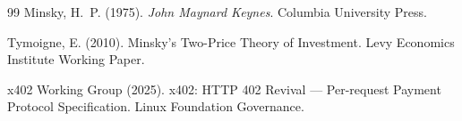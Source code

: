 \documentclass[11pt,letterpaper]{article}
\theoremstyle{assumption}
\begin{document}
\begin{thebibliography}{99}
Minsky, H.~P. (1975).
\newblock \emph{John Maynard Keynes}.
\newblock Columbia University Press.

Tymoigne, E. (2010).
\newblock Minsky's Two-Price Theory of Investment.
\newblock Levy Economics Institute Working Paper.

x402 Working Group (2025).
\newblock x402: HTTP 402 Revival --- Per-request Payment Protocol Specification.
\newblock Linux Foundation Governance.

\end{thebibliography}
\end{document}

